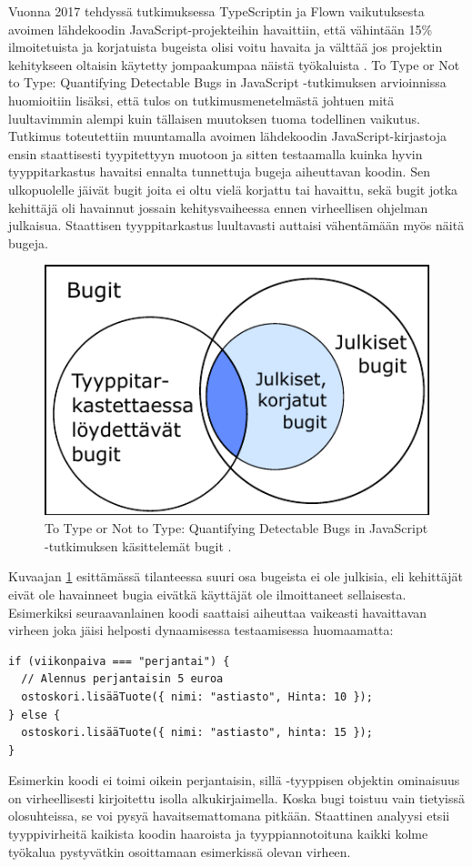 Vuonna 2017 tehdyssä tutkimuksessa TypeScriptin ja Flown vaikutuksesta avoimen
lähdekoodin JavaScript-projekteihin havaittiin, että vähintään 15\%
ilmoitetuista ja korjatuista bugeista olisi voitu havaita ja välttää jos
projektin kehitykseen oltaisin käytetty jompaakumpaa näistä työkaluista \cite{ToTypeOrNotToType}.
To Type or Not to Type: Quantifying Detectable Bugs in JavaScript -tutkimuksen
arvioinnissa huomioitiin lisäksi, että tulos on tutkimusmenetelmästä
johtuen mitä luultavimmin alempi kuin tällaisen muutoksen tuoma todellinen
vaikutus. Tutkimus toteutettiin muuntamalla avoimen lähdekoodin
JavaScript-kirjastoja ensin staattisesti tyypitettyyn muotoon ja sitten
testaamalla kuinka hyvin tyyppitarkastus havaitsi ennalta tunnettuja bugeja
aiheuttavan koodin. Sen ulkopuolelle jäivät bugit joita ei oltu vielä
korjattu tai havaittu, sekä bugit jotka kehittäjä oli havainnut jossain
kehitysvaiheessa ennen virheellisen ohjelman julkaisua. Staattisen
tyyppitarkastus luultavasti auttaisi vähentämään myös näitä bugeja.

\begin{figure}
\centering
\includegraphics{images/to_type_or_not_to_type_venn.pdf}
\caption{To Type or Not to Type: Quantifying Detectable Bugs in JavaScript
         -tutkimuksen käsittelemät bugit \cite{ToTypeOrNotToType}.}
\label{fig:ToTypeOrNotToType}
\end{figure}

Kuvaajan \ref{fig:ToTypeOrNotToType} esittämässä tilanteessa suuri osa
bugeista ei ole julkisia, eli kehittäjät eivät ole havainneet bugia eivätkä
käyttäjät ole ilmoittaneet sellaisesta. Esimerkiksi seuraavanlainen koodi
saattaisi aiheuttaa vaikeasti havaittavan virheen joka jäisi helposti dynaamisessa
testaamisessa huomaamatta:
\begin{lstlisting}[caption={Vaikeasti havaittavan virheen aiheuttava koodiesimerkki}]
if (viikonpaiva === "perjantai") {
  // Alennus perjantaisin 5 euroa
  ostoskori.lisääTuote({ nimi: "astiasto", Hinta: 10 });
} else {
  ostoskori.lisääTuote({ nimi: "astiasto", hinta: 15 });
}
\end{lstlisting}
Esimerkin koodi ei toimi oikein perjantaisin, sillä -tyyppisen
objektin ominaisuus  on virheellisesti kirjoitettu isolla
alkukirjaimella. Koska bugi toistuu vain tietyissä olosuhteissa, se voi pysyä
havaitsemattomana pitkään. Staattinen analyysi etsii tyyppivirheitä
kaikista koodin haaroista ja tyyppiannotoituna kaikki kolme työkalua
pystyvätkin osoittamaan esimerkissä olevan virheen.

